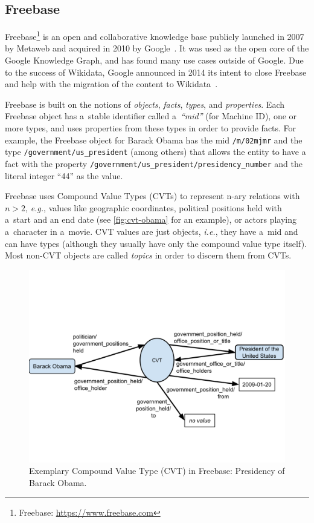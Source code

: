 \documentclass{acm_proc_article-sp}
\begin{document}
\subsection{Freebase}

Freebase\footnote{Freebase: \url{https://www.freebase.com}} is an open and
collaborative knowledge base publicly launched in 2007 by Metaweb and 
acquired in 2010 by Google~\cite{freebase}.
It was used as the open core of the Google Knowledge Graph,
and has found many use cases outside of Google.
Due to the success of Wikidata,
Google announced in 2014 its intent to close Freebase and help with
the migration of the content to Wikidata~\cite{freebase2014shutdown,freebase-end}.

Freebase is built on the notions of \emph{objects}, \emph{facts}, \emph{types}, and \emph{properties}.
Each Freebase object has a~stable identifier called a~\emph{``mid''} (for Machine ID),
one or more types, and uses properties from these types in order to provide facts.
For example, the Freebase object for Barack Obama has the mid \texttt{/m/02mjmr}
and the type \texttt{/government/us\_president} (among others) that allows the entity to have
a fact with the property \texttt{/government/us\_president/presidency\_number} \linebreak
and the literal integer ``44'' as the value.

Freebase uses Compound Value Types (CVTs) to represent
n-ary relations with $n>2$, \emph{e.g.}, values like geographic coordinates,
political positions held with a~start and an end date (see \autoref{fig:cvt-obama} for an example),
or actors playing a~character in a~movie.
CVT values are just objects, \emph{i.e.}, they have a~mid and can have types
(although they usually have only the compound value type itself).
Most non-CVT objects are called \emph{topics} in order to discern them from CVTs.

\begin{figure}[!htbp]
  \centering
  \includegraphics[trim=0cm 3cm 0cm 5cm, width=8.45 cm]{img/freebase-cvt-obama.pdf}
  \caption{Exemplary Compound Value Type (CVT) in Freebase: Presidency of Barack Obama.}
  \label{fig:cvt-obama}
\end{figure}
\end{document}
